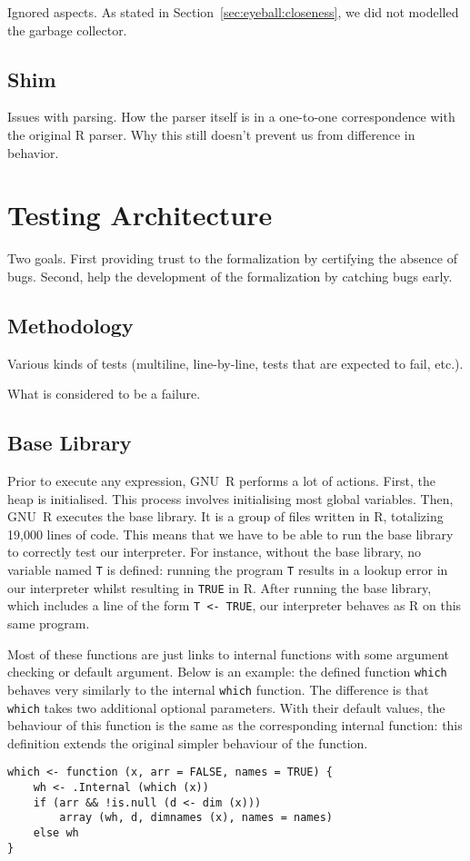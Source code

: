 \documentclass[
    sigplan,
    10pt,
    review, %
    natbib=false %
 ]{acmart}
\begin{document}
Ignored aspects.
As stated in Section~\ref{sec:eyeball:closeness},
we did not modelled the garbage collector.

\subsection{Shim}
\label{sec:shim}

Issues with parsing.
How the parser itself is in a one-to-one correspondence with the original R parser.
Why this still doesn't prevent us from difference in behavior.


\section{Testing Architecture}
\label{sec:testing:architecture}

Two goals.
First providing trust to the formalization by certifying the absence of bugs.
Second, help the development of the formalization by catching bugs early.

\subsection{Methodology}
\label{sec:test:methodology}

Various kinds of tests (multiline, line-by-line, tests that are expected to fail, etc.).

What is considered to be a failure.

\subsection{Base Library}
\label{sec:library}

Prior to execute any expression, GNU~R performs a lot of actions.
First, the heap is initialised.
This process involves initialising most global variables.
Then, GNU~R executes the base library.
It is a group of files written in R,
totalizing 19,000 lines of code.
%
This means that we have to be able to run the base library
to correctly test our interpreter.
For instance, without the base library,
no variable named \texttt{T} is defined:
running the program \texttt{T} results in a lookup error
in our interpreter whilst resulting in \texttt{TRUE} in R.
After running the base library,
which includes a line of the form \texttt{T <- TRUE},
our interpreter behaves as R on this same program.

Most of these functions are just links to internal functions
with some argument checking or default argument.
Below is an example:
the defined function \texttt{which} behaves very similarly
to the internal \texttt{which} function.
The difference is that \texttt{which} takes two additional
optional parameters.
With their default values, the behaviour of this function
is the same as the corresponding internal function:
this definition extends the original simpler behaviour of the function.
\begin{verbatim}
which <- function (x, arr = FALSE, names = TRUE) {
    wh <- .Internal (which (x))
    if (arr && !is.null (d <- dim (x)))
        array (wh, d, dimnames (x), names = names)
    else wh
}
\end{verbatim}
\end{document}
